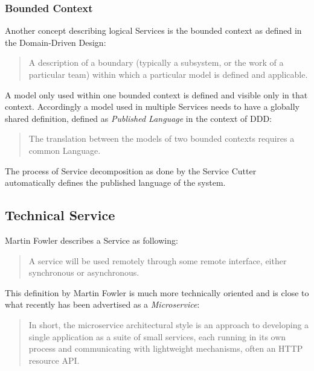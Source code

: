 \subsubsection{Bounded Context}

Another concept describing logical Services is the bounded context as defined in the Domain-Driven Design:\cite{evans2014domain}

\begin{quotation}
	A description of a boundary (typically a subsystem, or the work of a particular team) within which a particular model is defined and applicable.
\end{quotation}

A model only used within one bounded context is defined and visible only in that context. Accordingly a model used in multiple Services needs to have a globally shared definition, defined as \textit{Published Language} in the context of \gls{DDD}\cite{evans2014domain}:

\begin{quotation}
	The translation between the models of two bounded contexts requires a common Language.
\end{quotation}

The process of Service decomposition as done by the Service Cutter automatically defines the published language of the system. 

\subsection{Technical Service}

Martin Fowler describes a Service as following:

\begin{quotation}
	A service will be used remotely through some remote interface, either synchronous or asynchronous.\cite{fowlerIoC}
\end{quotation}

This definition by Martin Fowler is much more technically oriented and is close to what recently has been advertised as a \textit{Microservice}:

\begin{quotation}
	In short, the microservice architectural style is an approach to developing a single application as a suite of small services, each running in its own process and communicating with lightweight mechanisms, often an HTTP resource API.\cite{fowlerMicroservice}
\end{quotation}


